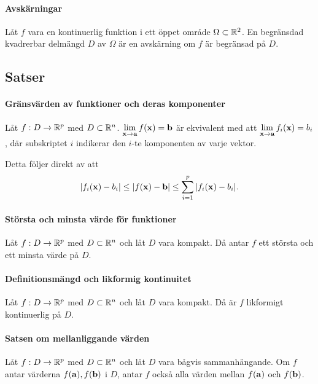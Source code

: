 \paragraph{Avskärningar}
Låt $f$ vara en kontinuerlig funktion i ett öppet område $\Omega\subset\mathbb{R}^2$. En begränsdad kvadrerbar delmängd $D$ av $\Omega$ är en avskärning om $f$ är begränsad på $D$.

\subsection{Satser}

\paragraph{Gränsvärden av funktioner och deras komponenter}
Låt $f: D\to\mathbb{R}^p$ med $D\subset\mathbb{R}^n$. $\lim\limits_{\vb{x}\to \vb{a}}f(\vb{x}) = \vb{b}$ är ekvivalent med att $\lim\limits_{\vb{x}\to \vb{a}}f_i(\vb{x}) = b_i$, där subskriptet $i$ indikerar den $i$-te komponenten av varje vektor.

\proof
Detta följer direkt av att
\begin{align*}
	\abs{f_i(\vb{x}) - b_i}\leq\abs{f(\vb{x}) - \vb{b}}\leq\sum\limits_{i = 1}^{p}\abs{f_i(\vb{x}) - b_i}.
\end{align*}

\paragraph{Största och minsta värde för funktioner}
Låt $f: D\to\mathbb{R}^p$ med $D\subset\mathbb{R}^n$ och låt $D$ vara kompakt. Då antar $f$ ett största och ett minsta värde på $D$.

\proof

\paragraph{Definitionsmängd och likformig kontinuitet}
Låt $f: D\to\mathbb{R}^p$ med $D\subset\mathbb{R}^n$ och låt $D$ vara kompakt. Då är $f$ likformigt kontinuerlig på $D$.

\proof

\paragraph{Satsen om mellanliggande värden}
Låt $f: D\to\mathbb{R}^p$ med $D\subset\mathbb{R}^n$ och låt $D$ vara bågvis sammanhängande. Om $f$ antar värderna $f(\vb{a}), f(\vb{b})$ i $D$, antar $f$ också alla värden mellan $f(\vb{a})$ och $f(\vb{b})$.


